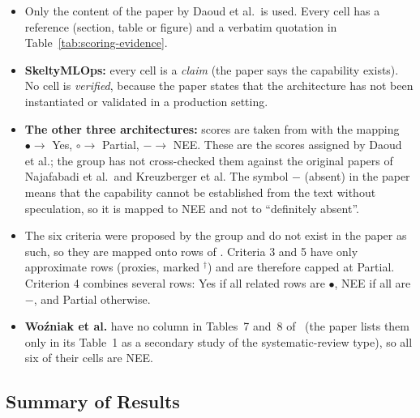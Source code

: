 \begin{itemize}
  \item Only the content of the paper by Daoud et al.\ is used. Every cell has a reference (section, table or figure) and a verbatim quotation in Table~\ref{tab:scoring-evidence}.
  \item \textbf{SkeltyMLOps:} every cell is a \emph{claim} (the paper says the capability exists). No cell is \emph{verified}, because the paper states that the architecture has not been instantiated or validated in a production setting.
  \item \textbf{The other three architectures:} scores are taken from  with the mapping $\bullet \rightarrow$ Yes, $\circ \rightarrow$ Partial, $- \rightarrow$ NEE. These are the scores assigned by Daoud et al.; the group has not cross-checked them against the original papers of Najafabadi et al.\ and Kreuzberger et al. The symbol $-$ (absent) in the paper means that the capability cannot be established from the text without speculation, so it is mapped to NEE and not to ``definitely absent''.
  \item The six criteria were proposed by the group and do not exist in the paper as such, so they are mapped onto rows of . Criteria 3 and 5 have only approximate rows (proxies, marked $^{\dagger}$) and are therefore capped at Partial. Criterion 4 combines several rows: Yes if all related rows are $\bullet$, NEE if all are $-$, and Partial otherwise.
  \item \textbf{Wo\'{z}niak et al.} have no column in Tables~7 and~8 of~\papercite{} (the paper lists them only in its Table~1 as a secondary study of the systematic-review type), so all six of their cells are NEE.
\end{itemize}

\subsection{Summary of Results}

